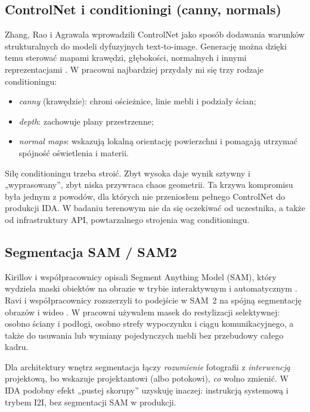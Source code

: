 \subsection{ControlNet i conditioningi (canny, normals)}
\label{ch04:sec:controlnet}

Zhang, Rao i Agrawala wprowadzili ControlNet jako sposób dodawania warunków strukturalnych do modeli dyfuzyjnych text-to-image. Generację można dzięki temu sterować mapami krawędzi, głębokości, normalnych i innymi reprezentacjami \parencite{zhang2023controlnet}.
W pracowni najbardziej przydały mi się trzy rodzaje conditioningu:
\begin{itemize}
  \item \emph{canny} (krawędzie): chroni ościeżnice, linie mebli i podziały ścian;
  \item \emph{depth}: zachowuje plany przestrzenne;
  \item \emph{normal maps}: wskazują lokalną orientację powierzchni i pomagają utrzymać spójność oświetlenia i materii.
\end{itemize}
Siłę conditioningu trzeba stroić. Zbyt wysoka daje wynik sztywny i „wyprasowany”, zbyt niska przywraca chaos geometrii.
Ta krzywa kompromisu była jednym z powodów, dla których nie przeniosłem pełnego ControlNet do produkcji IDA. W badaniu terenowym nie da się oczekiwać od uczestnika, a także od infrastruktury API, powtarzalnego strojenia wag conditioningu.

\subsection{Segmentacja SAM / SAM2}
\label{ch04:sec:sam}

Kirillov i współpracownicy opisali Segment Anything Model (SAM), który wydziela maski obiektów na obrazie w trybie interaktywnym i automatycznym \parencite{kirillov2023sam}. Ravi i współpracownicy rozszerzyli to podejście w SAM~2 na spójną segmentację obrazów i wideo \parencite{ravi2024sam2}.
W pracowni używałem masek do restylizacji selektywnej: osobno ściany i podłogi, osobno strefy wypoczynku i ciągu komunikacyjnego, a także do usuwania lub wymiany pojedynczych mebli bez przebudowy całego kadru.

Dla architektury wnętrz segmentacja łączy \emph{rozumienie} fotografii z \emph{interwencją} projektową, bo wskazuje projektantowi (albo potokowi), \emph{co} wolno zmienić.
W IDA podobny efekt „pustej skorupy” uzyskuję inaczej: instrukcją systemową i trybem I2I, bez segmentacji SAM w produkcji.

